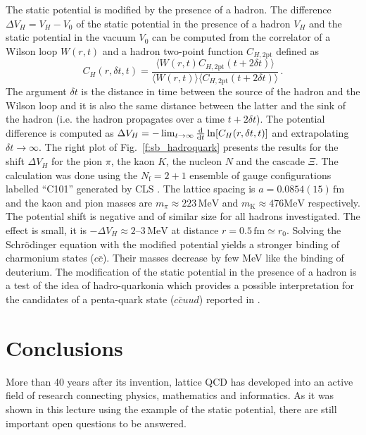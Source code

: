 \documentclass{PoS}
\newcommand{\fig}[1]{Fig.~\ref{#1}}
\def\nf{N_{\mathrm{f}}}
\begin{document}
The static potential is modified by the presence of a hadron.
The difference $\Delta V_H=V_H-V_0$ of the static potential in the presence
of a hadron $V_H$ and the static potential in the vacuum $V_0$ 
can be computed from the correlator 
of a Wilson loop $W(r,t)$ and a hadron two-point function $C_{H,\mathrm{2pt}}$
defined as \cite{Alberti:2016dru}
\begin{equation}
C_H(r, \delta t, t) =
\frac{\langle W(r,t)C_{H,\mathrm{2pt}}(t+2\delta t)\rangle}{\langle W(r,t)\rangle
\langle C_{H,\mathrm{2pt}}(t+2\delta t)\rangle} \,.
\end{equation}
The argument $\delta t$ is the distance in time between the source of the hadron and the Wilson loop and it is also the same distance between the latter and the sink of the hadron (i.e. the hadron
propagates over a time $t+2\delta t$).
The potential difference is computed as $\Delta V_H = -\lim_{t\rightarrow\infty}\frac{{\rm d}}{{\rm d}t}\ln[C_H(r, \delta t, t)]$ and extrapolating $\delta t\to\infty$. 
The right plot of \fig{f:sb_hadroquark} presents the results for the
shift $\Delta V_H$ for the pion $\pi$, the kaon $K$, the nucleon $N$ and the 
cascade $\Xi$. The calculation was done using the $\nf=2+1$ ensemble of gauge configurations labelled ``C101'' generated by CLS \cite{Bruno:2014jqa}.
The lattice spacing is $a=0.0854(15)\,\mathrm{fm}$ and the kaon and pion
masses are $m_\pi\approx223\,\mathrm{MeV}$ and
$m_\mathrm{K}\approx476\mathrm{MeV}$ respectively.
The potential shift is negative and of similar size for all hadrons 
investigated. The effect is small, it is 
$-\Delta V_H\approx2$--$3\,\mathrm{MeV}$
at distance $r=0.5\,\mathrm{fm}\simeq r_0$. 
Solving the Schr{\"o}dinger equation with the modified potential
yields a stronger binding of charmonium states ($c\bar{c}$). 
Their masses decrease by few MeV like the binding of deuterium.
The modification of the static potential in the presence of a hadron is
a test of the idea of hadro-quarkonia \cite{Dubynskiy:2008mq}
which provides a possible interpretation
for the candidates of a penta-quark state ($c\bar{c}uud$) reported in
\cite{Aaij:2015tga,Aaij:2016phn}.


\section{Conclusions}

More than 40 years after its invention, lattice QCD has
developed into an active field of research connecting physics, mathematics and 
informatics. As it was shown in this lecture using the example of the static 
potential, there are still important open questions to be answered.
\end{document}
